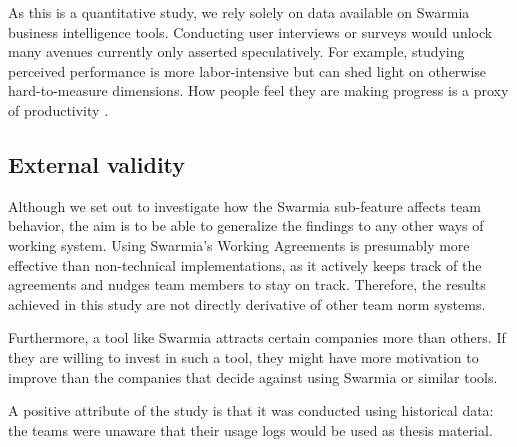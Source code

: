 As this is a quantitative study, we rely solely on data available on Swarmia business intelligence tools. Conducting user interviews or surveys would unlock many avenues currently only asserted speculatively. For example, studying perceived performance is more labor-intensive but can shed light on otherwise hard-to-measure dimensions. How people feel they are making progress is a proxy of productivity \cite{forsgren_space_2021}.

\subsection{External validity}

Although we set out to investigate how the Swarmia sub-feature affects team behavior, the aim is to be able to generalize the findings to any other ways of working system. Using Swarmia's Working Agreements is presumably more effective than non-technical implementations, as it actively keeps track of the agreements and nudges team members to stay on track. Therefore, the results achieved in this study are not directly derivative of other team norm systems. 

Furthermore, a tool like Swarmia attracts certain companies more than others. If they are willing to invest in such a tool, they might have more motivation to improve than the companies that decide against using Swarmia or similar tools. 

A positive attribute of the study is that it was conducted using historical data: the teams were unaware that their usage logs would be used as thesis material.

